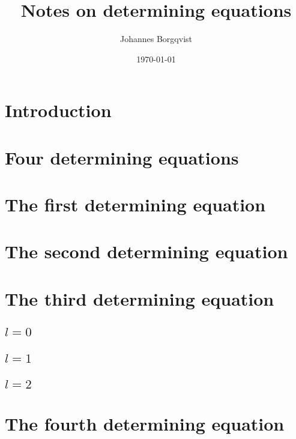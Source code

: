 \documentclass[a4paper,12pt]{article}
\title{Notes on determining equations}
\author{Johannes Borgqvist}
\date{\today}
\begin{document}
\maketitle
\tableofcontents
\section{Introduction}


  
\section{Four determining equations}


\section{The first determining equation}


\section{The second determining equation}


\section{The third determining equation}


\subsection{$l=0$}


\subsection{$l=1$}


\subsection{$l=2$}


\section{The fourth determining equation}

\end{document}
